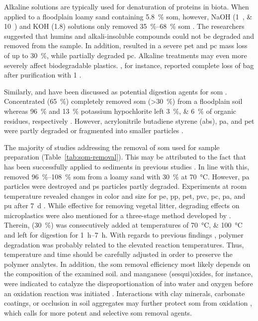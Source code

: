 Alkaline solutions are typically used for denaturation of proteins in biota. When applied to a floodplain loamy sand containing \SI{5.8}{\percent} \ac{som},
however, NaOH (\SIlist{1;10}{\Molar}) and KOH (\SI{1.8}{\Molar}) solutions only removed
\SIrange{35}{68}{\percent} \ac{som} \citep{HurleyValidation2018}. The researchers suggested that humins and alkali-insoluble compounds could not be degraded and removed from the sample. In addition,  resulted in a severe \ac{pet} and \ac{pc} mass loss of up to \SI{30}{\percent}, while  partially degraded \ac{pc}. Alkaline treatments may even more severely affect biodegradable plastics. ,
for instance, reported complete loss of  bag after purification with \SI{1}{\Molar} .

Similarly,  and  have been discussed as potential digestion agents for \ac{som} \citep{BlasingPlastics2018}. Concentrated
 (\SI{65}{\percent}) completely removed \ac{som} (\SI{>30}{\percent})
from a floodplain soil whereas \SI{96}{\percent}
 and \SI{13}{\percent} potassium hypochlorite left \SIlist{3;6}{\percent} of organic residues,
respectively \citep{ScheurerMicroplastics2018}. However, acrylonitrile butadiene styrene (\ac{abs}), \ac{pa}, and \ac{pet} were partly degraded or fragmented into smaller particles \citep{ScheurerMicroplastics2018}.

The majority of studies addressing the removal of \ac{som} used
 for sample preparation
(Table~\ref{tab:som-removal}). This may be attributed to the fact that  has been successfully applied to sediments in previous studies \citep{NuelleNew2014,ImhofNovel2012}. In line with this, \citet{HurleyValidation2018}
removed \SIrange{96}{108}{\percent} \ac{som} from a loamy sand with \SI{30}{\percent}
 at \SI{70}{\degreeCelsius}. However, \ac{pa} particles were destroyed and \ac{ps} particles partly degraded. Experiments at room temperature revealed changes in color and size for \ac{pe}, \ac{pp}, \ac{pet}, \ac{pvc},
\ac{pc}, \ac{pa}, and \ac{pu} after \SI{7}{\day} \citep{NuelleNew2014}. While effective for removing vegetal litter, degrading effects on microplastics were also mentioned for a three-stage method developed by \citet{DuanDevelopment2020}.
Therein,  (\SI{30}{\percent}) was consecutively added at temperatures of \SIlist{70;100}{\degreeCelsius} and left for digestion for \SIrange{1}{7}{\hour}. With regards to previous findings \citep{HurleyValidation2018}, polymer degradation was probably related to the elevated reaction temperatures. Thus, temperature and time should be carefully adjusted in order to preserve the polymer analytes. In addition, the \ac{som} removal efficiency most likely depends on the composition of the examined soil.  and manganese (sesqui)oxides, for instance,
were indicated to catalyze the disproportionation of
 into water and oxygen before an oxidation reaction was initiated \citep{PetigaraMechanisms2002}. Interactions with clay minerals, carbonate coatings, or occlusion in soil aggregates may further protect \ac{som} from oxidation \citep{MikuttaOrganic2005}, which calls for more potent and selective \ac{som} removal agents.

